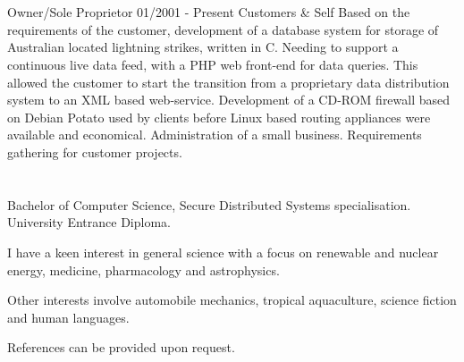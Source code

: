 \section{\dZN}

\lskip
{} Owner/Sole Proprietor
 01/2001 - Present
 Customers \& Self
 Based on the requirements of the customer, development of a database system for storage of Australian located lightning strikes, written in C. Needing to support a continuous live data feed, with a PHP web front-end for data queries. This allowed the customer to start the transition from a proprietary data distribution system to an XML based web-service.
\dashtopic Development of a CD-ROM firewall based on Debian {\mi Potato} used by clients before Linux based routing appliances were available and economical.
 Administration of a small business.
\dashtopic Requirements gathering for customer projects.
\pskip


\section{\UOW}

\lskip
{} Bachelor of Computer Science, Secure Distributed Systems specialisation.
 University Entrance Diploma.
\pskip


I have a keen interest in general science with a focus on renewable and nuclear energy, medicine, pharmacology and astrophysics.

Other interests involve automobile mechanics, tropical aquaculture, science fiction and human languages.


References can be provided upon request.

\bye
